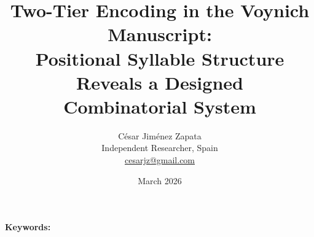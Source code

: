 \documentclass[11pt,a4paper]{article}
\begin{document}
\title{Two-Tier Encoding in the Voynich Manuscript:\\
Positional Syllable Structure Reveals a Designed\\
Combinatorial System}

\author{C\'esar Jim\'enez Zapata\\
\small Independent Researcher, Spain\\
\small \href{mailto:cesarjz@gmail.com}{cesarjz@gmail.com}}

\date{March 2026}

\maketitle

\begin{abstract}

\end{abstract}

\noindent\textbf{Keywords:} 





\end{document}
